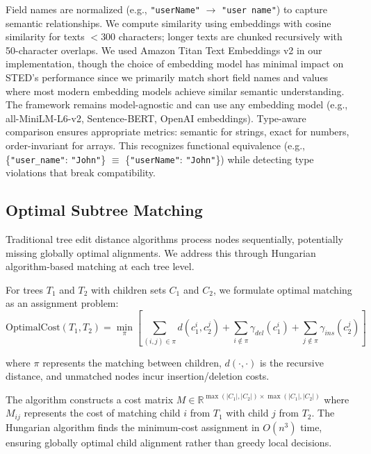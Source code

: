 \documentclass{article}
\begin{document}
Field names are normalized (e.g., \texttt{"userName"} $\rightarrow$ \texttt{"user name"}) to capture semantic relationships. We compute similarity using embeddings with cosine similarity for texts $<300$ characters; longer texts are chunked recursively with 50-character overlaps. We used Amazon Titan Text Embeddings v2 in our implementation, though the choice of embedding model has minimal impact on STED's performance since we primarily match short field names and values where most modern embedding models achieve similar semantic understanding. The framework remains model-agnostic and can use any embedding model (e.g., all-MiniLM-L6-v2, Sentence-BERT, OpenAI embeddings). Type-aware comparison ensures appropriate metrics: semantic for strings, exact for numbers, order-invariant for arrays. This recognizes functional equivalence (e.g., \{\texttt{"user\_name"}: \texttt{"John"}\} $\equiv$ \{\texttt{"userName"}: \texttt{"John"}\}) while detecting type violations that break compatibility.

\subsection{Optimal Subtree Matching}

Traditional tree edit distance algorithms process nodes sequentially, potentially missing globally optimal alignments. We address this through Hungarian algorithm-based matching at each tree level.

For trees $T_1$ and $T_2$ with children sets $C_1$ and $C_2$, we formulate optimal matching as an assignment problem:
\vspace{-2mm}
\begin{equation}
\text{OptimalCost}(T_1, T_2) = \min_{\pi} \left[ \sum_{(i,j) \in \pi} d(c_1^i, c_2^j) + \sum_{i \notin \pi} \gamma_{del}(c_1^i) + \sum_{j \notin \pi} \gamma_{ins}(c_2^j) \right]
\end{equation}

where $\pi$ represents the matching between children, $d(\cdot, \cdot)$ is the recursive distance, and unmatched nodes incur insertion/deletion costs.

The algorithm constructs a cost matrix $M \in \mathbb{R}^{\max(|C_1|, |C_2|) \times \max(|C_1|, |C_2|)}$ where $M_{ij}$ represents the cost of matching child $i$ from $T_1$ with child $j$ from $T_2$. The Hungarian algorithm finds the minimum-cost assignment in $O(n^3)$ time, ensuring globally optimal child alignment rather than greedy local decisions.
\end{document}
